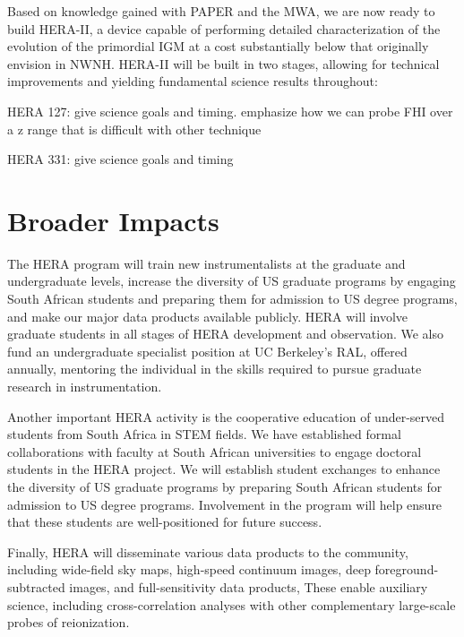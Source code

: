 \documentclass[preprint]{aastex}
\begin{document}
Based on knowledge gained with PAPER and the MWA, we are now ready to build HERA-II, a device
capable of performing detailed characterization of the evolution of the primordial IGM at
a cost substantially below that originally envision in NWNH. HERA-II will be built in two stages, 
allowing for technical improvements and yielding fundamental science results throughout:

HERA 127: give science goals and timing. emphasize how we can probe FHI over a z range that is
difficult with other technique

HERA 331: give science goals and timing 

\section*{Broader Impacts}

The HERA program will train new instrumentalists at the graduate and undergraduate levels, increase the
diversity of US graduate programs by engaging South African students and
preparing them for admission to US degree programs, and make our major data
products available publicly. HERA will involve graduate students in all
stages of HERA development and observation. We also fund an
undergraduate specialist position
at UC Berkeley's RAL, offered annually,
mentoring the individual in the skills required to pursue graduate
research in instrumentation.

Another important HERA activity is the cooperative education of
under-served students from South Africa in STEM fields.
We have established formal collaborations
with faculty at South African universities to engage doctoral students in the HERA project.
We will establish student exchanges to enhance
the diversity of US graduate programs by preparing South African students for
admission to US degree programs.
Involvement in the program will help ensure that these students are well-positioned for
future success.

Finally, HERA will disseminate various data products to the community,
including wide-field sky maps, high-speed continuum images, deep
foreground-subtracted images, and full-sensitivity data products,  These enable
auxiliary science, including cross-correlation analyses with other 
complementary large-scale
probes of reionization.
\end{document}
